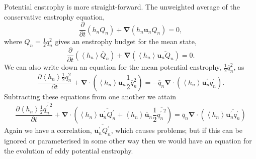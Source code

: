 \documentclass[12pt,a4paper]{report}
\newcommand*\thkmean[1]{\overline{#1}}
\newcommand*\thkres[1]{{#1}^{\prime}}
\newcommand*\nthkmean[1]{\left\langle{#1}\right\rangle}
\newcommand*{\half}{\frac{1}{2}}
\newcommand*{\partialdiff}[2][{}]{\frac{\partial #1}{\partial #2}}
\begin{document}
              Potential enstrophy is more straight-forward. The unweighted average of the
              conservative enstrophy equation,
              \begin{equation*}
              \partialdiff{t}\left(h_{n}Q_{n}\right)+\boldsymbol{\nabla}\left(h_{n}\boldsymbol{u}_{n}Q_{n}\right) = 0,
              \end{equation*}
              where $Q_{n} = \half q_{n}^{2}$ gives an
              enstrophy budget for the mean state,  
              \begin{equation*}
              \partialdiff{t}\left(\nthkmean{h_{n}}\thkmean{Q}_{n}\right)+\boldsymbol{\nabla}\left(\nthkmean{h_{n}}\thkmean{\boldsymbol{u}_{n}Q_{n}}\right) = 0.
              \end{equation*}
              We can also write down an equation for the mean potential enstrophy,
              $\half \thkmean{q}_{n}^{2}$, as
              \begin{equation*}
               \partialdiff[\nthkmean{h_{n}} \half \thkmean{q}_{n}^{2}]{t}+   \boldsymbol{\nabla}\cdot \left(\nthkmean{h_{n}} \thkmean{\boldsymbol{u}}_{n} \half \thkmean{q}_{n}^{2}\right) =-\thkmean{q}_{n} \boldsymbol{\nabla}\cdot\left( \nthkmean{h_{n}} \thkmean{\thkres{\boldsymbol{u}}_{n}\thkres{q}_{n}} \right).
              \end{equation*}
              Subtracting these equations from one another  we attain
              \begin{equation}
              \partialdiff[\nthkmean{h_{n}} \half \thkmean{{\thkres{q}_{n}}^{2}}]{t}+   \boldsymbol{\nabla}\cdot \left(\nthkmean{h_{n}} \thkmean{\thkres{\boldsymbol{u}}_{n} \thkres{Q}_{n}}+\nthkmean{h_{n}} \thkmean{\boldsymbol{u}}_{n} \half \thkmean{{\thkres{q}_{n}}^{2}}\right) =\thkmean{q}_{n} \boldsymbol{\nabla}\cdot\left( \nthkmean{h_{n}} \thkmean{\thkres{\boldsymbol{u}}_{n}\thkres{q}_{n}} \right)
              \label{eddyenstrophy}
              \end{equation}
              Again we have a correlation, $\thkmean{\thkres{\boldsymbol{u}}_{n} \thkres{Q}_{n}}$, which causes problems; but if this
              can be ignored or parameterised in some other way then we
              would have an equation for the evolution
              of eddy potential enstrophy.
              
\end{document}
